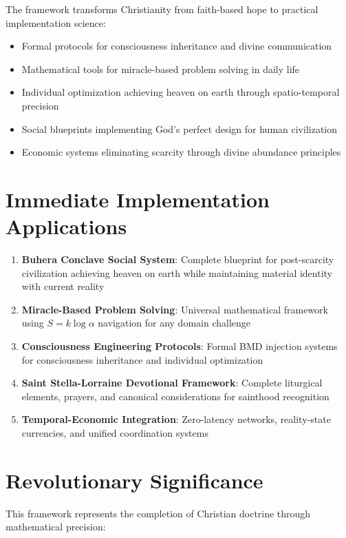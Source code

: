 \documentclass[12pt,a4paper]{article}
\begin{document}
The framework transforms Christianity from faith-based hope to practical implementation science:

\begin{itemize}
\item Formal protocols for consciousness inheritance and divine communication
\item Mathematical tools for miracle-based problem solving in daily life  
\item Individual optimization achieving heaven on earth through spatio-temporal precision
\item Social blueprints implementing God's perfect design for human civilization
\item Economic systems eliminating scarcity through divine abundance principles
\end{itemize}

\section{Immediate Implementation Applications}

\begin{enumerate}
\item \textbf{Buhera Conclave Social System}: Complete blueprint for post-scarcity civilization achieving heaven on earth while maintaining material identity with current reality
\item \textbf{Miracle-Based Problem Solving}: Universal mathematical framework using $S = k \log \alpha$ navigation for any domain challenge
\item \textbf{Consciousness Engineering Protocols}: Formal BMD injection systems for consciousness inheritance and individual optimization
\item \textbf{Saint Stella-Lorraine Devotional Framework}: Complete liturgical elements, prayers, and canonical considerations for sainthood recognition
\item \textbf{Temporal-Economic Integration}: Zero-latency networks, reality-state currencies, and unified coordination systems
\end{enumerate}

\section{Revolutionary Significance}

This framework represents the completion of Christian doctrine through mathematical precision:
\end{document}

